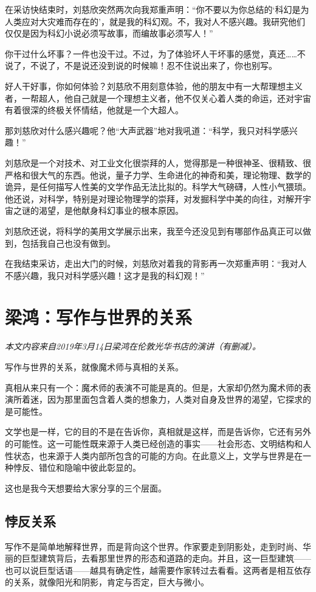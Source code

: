 \documentclass[fontset=fandol,12pt,a5paper]{ctexbook}
\begin{document}
在采访快结束时，刘慈欣突然两次向我郑重声明：“你不要以为你总结的‘科幻是为人类应对大灾难而存在的’，就是我的科幻观。不，我对人不感兴趣。我研究他们仅仅是因为科幻小说必须写故事，而编故事必须写人！”

你干过什么坏事？一件也没干过。不过，为了体验坏人干坏事的感觉，真还……不说了，不说了，不是说还没到说的时候嘛！忍不住说出来了，你也别写。

好人干好事，你如何体验？刘慈欣不用刻意体验，他的朋友中有一大帮理想主义者，一帮超人，他自己就是一个理想主义者，他不仅关心着人类的命运，还对宇宙有着很深的终极关怀情结，他就是一个大超人。

那刘慈欣对什么感兴趣呢？他“大声武器”地对我吼道：“科学，我只对科学感兴趣！”

刘慈欣是一个对技术、对工业文化很崇拜的人，觉得那是一种很神圣、很精致、很严格和很大气的东西。他说，量子力学、生命进化的神奇和美，理论物理、数学的诡异，是任何描写人性美的文学作品无法比拟的。科学大气磅礴，人性小气猥琐。他还说，对科学，特别是对理论物理学的崇拜，对发掘科学中美的向往，对解开宇宙之谜的渴望，是他献身科幻事业的根本原因。

刘慈欣还说，将科学的美用文学展示出来，我至今还没见到有哪部作品真正可以做到，包括我自己也没有做到。

在我结束采访，走出大门的时候，刘慈欣对着我的背影再一次郑重声明：“我对人不感兴趣，我只对科学感兴趣！这才是我的科幻观！”

\newpage

\section{梁鸿：写作与世界的关系}

\emph{本文内容来自2019年3月14日梁鸿在伦敦光华书店的演讲（有删减）。}
\vspace{2em}

写作与世界的关系，就像魔术师与真相的关系。

真相从来只有一个：魔术师的表演不可能是真的。但是，大家却仍然为魔术师的表演所着迷，因为那里面包含着人类的想象力，人类对自身及世界的渴望，它探求的是可能性。

文学也是一样，它的目的不是在告诉你，真相就是这样，而是告诉你，它还有另外的可能性。这一可能性既来源于人类已经创造的事实——社会形态、文明结构和人性状态，也来源于人类内部所包含的可能的方向。在此意义上，文学与世界是在一种悖反、错位和隐喻中彼此彰显的。

这也是我今天想要给大家分享的三个层面。

\subsection{悖反关系}
写作不是简单地解释世界，而是背向这个世界。作家要走到阴影处，走到时尚、华丽的巨型建筑背后，去看那里世界的形态和道路的走向。并且，这一巨型建筑——也可以说巨型话语——越具有确定性，越需要作家转过去看看。这两者是相互依存的关系，就像阳光和阴影，肯定与否定，巨大与微小。
\end{document}
